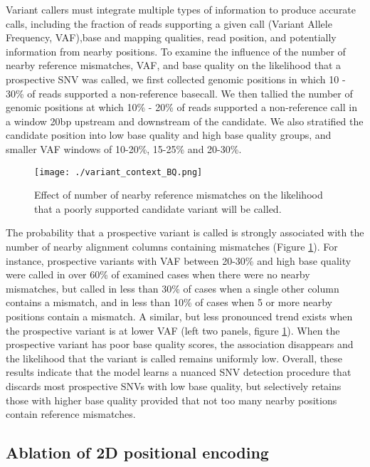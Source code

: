 \documentclass[]{article}
\begin{document}
Variant callers must integrate multiple types of information to produce accurate calls, including the fraction of reads supporting a given call (Variant Allele Frequency, VAF),base and mapping qualities, read position, and potentially information from nearby positions. To examine the influence of the number of nearby reference mismatches, VAF, and base quality on the likelihood that a prospective SNV was called, we first collected genomic positions in which 10 - 30\% of reads supported a non-reference basecall. We then tallied the number of genomic positions at which 10\% - 20\% of reads supported a non-reference call in a window 20bp upstream and downstream of the candidate. We also stratified the candidate position into low base quality and high base quality groups, and smaller VAF windows of 10-20\%, 15-25\% and 20-30\%.  

\begin{figure}[htp]
	\texttt{[image: ./variant\_context\_BQ.png]}
	\caption{ Effect of number of nearby reference mismatches on the likelihood that a poorly supported candidate variant will be called. }
	\label{fig:variant_context}
\end{figure}

The probability that a prospective variant is called is strongly associated with the number of nearby alignment columns containing mismatches (Figure \ref{fig:variant_context}). For instance, prospective variants with VAF between 20-30\% and high base quality were called in over 60\% of examined cases when there were no nearby mismatches, but called in less than 30\% of cases when a single other column contains a mismatch, and in less than 10\% of cases when 5 or more nearby positions contain a mismatch. A similar, but less pronounced trend exists when the prospective variant is at lower VAF (left two panels, figure \ref{fig:variant_context}). When the prospective variant has poor base quality scores, the association disappears and the likelihood that the variant is called remains uniformly low. Overall, these results indicate that the model learns a nuanced SNV detection procedure that discards most prospective SNVs with low base quality, but selectively retains those with higher base quality provided that not too many nearby positions contain reference mismatches.


\subsection{Ablation of 2D positional encoding}
\end{document}
